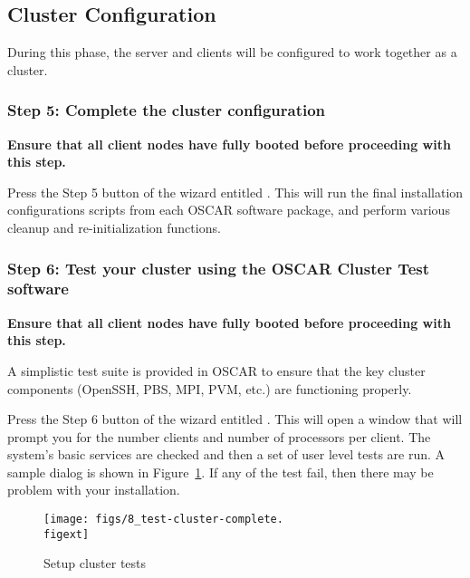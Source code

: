 
\subsection{Cluster Configuration}

During this phase, the server and clients will be configured to work
together as a cluster.


\subsubsection{Step 5: Complete the cluster configuration}
\label{det:completeinstall}

{\bf Ensure that all client nodes have fully booted before proceeding
  with this step.}

Press the Step 5 button of the wizard entitled .  This will run the final installation configurations
scripts from each OSCAR software package, and perform various cleanup
and re-initialization functions.


\subsubsection{Step 6: Test your cluster using the OSCAR Cluster Test
  software}
\label{det:testcluster}
            
{\bf Ensure that all client nodes have fully booted before proceeding
  with this step.}

A simplistic test suite is provided in OSCAR to ensure that the key
cluster components (OpenSSH, PBS, MPI, PVM, etc.) are functioning
properly.

Press the Step 6 button of the wizard entitled . This will open a window that will prompt you for the number
clients and number of processors per client. The system's basic
services are checked and then a set of user level tests are run. A
sample dialog is shown in Figure~\ref{fig:detailed-setup-test}. If any
of the test fail, then there may be problem with your installation.

\begin{figure}[htbp]
  \begin{center}
    \texttt{[image: figs/8\_test-cluster-complete.\\figext]}
    \caption{Setup cluster tests}
    \label{fig:detailed-setup-test}
  \end{center}
\end{figure}

